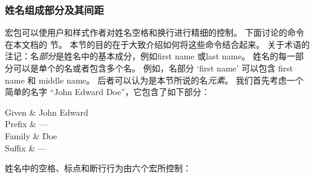 \subsubsection{姓名组成部分及其间距}
\label{use:cav:nam}


\biblatex 宏包可以使用户和样式作者对姓名空格和换行进行精细的控制。
下面讨论的命令在本文档的  节。
本节的目的在于大致介绍如何将这些命令结合起来。
关于术语的注记：名\emph{部分}是姓名中的基本成分，例如first name 或last name。
姓名的每一部分可以是单个的名或者包含多个名。
例如，名部分 \enquote*{first name} 可以包含 first name 和 middle name。
后者可以认为是本节所说的名\emph{元素}。
我们首先考虑一个简单的名字 \enquote{John Edward Doe}，它包含了如下部分：

\begin{nameparts}
Given	& John Edward \\
Prefix	& --- \\
Family	& Doe \\
Suffix	& --- \\
\end{nameparts}
%
姓名中的空格、标点和断行行为由六个宏所控制：

